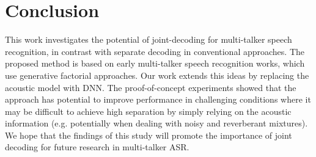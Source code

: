 \documentclass[a4paper]{article}
\newcommand\todo[1]{\textcolor{red}{[[#1]]}}
\DeclareMathOperator*{\argmax}{arg\,max}
\begin{document}



\section{Conclusion}

This work investigates the potential of joint-decoding for multi-talker speech recognition, in contrast with separate decoding in conventional approaches.
The proposed method is based on early multi-talker speech recognition works, which use generative factorial approaches. Our work extends this ideas by replacing the acoustic model with DNN. The proof-of-concept experiments showed that the approach has potential to improve performance in challenging conditions where it may be difficult to achieve high separation by simply relying on the acoustic information (e.g. potentially when dealing with noisy and reverberant mixtures). We hope that the findings of this study will promote the importance of joint decoding for future research in multi-talker ASR.
\end{document}
